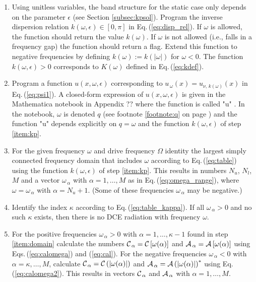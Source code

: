 \begin{enumerate}

\item \label{item:kp} 
Using unitless variables,
the band structure for the static case only depends on the parameter $\epsilon$
(see Section \ref{subsec:kpsol}).
Program the inverse dispersion relation $k(\omega, \epsilon) \in [0, \pi]$ 
in Eq.\,(\ref{eq:disp_rel}). 
If $\omega$ is allowed, the function should return the value $k(\omega)$. If $\omega$ is not allowed 
(i.e., falls in a frequency gap) the function should return a flag.
Extend this function to negative frequencies by defining $k(\omega) := k(|\omega|)$ for $\omega < 0$.
The function $k(\omega, \epsilon) > 0$ corresponds to $K(\omega)$ defined in Eq.\,(\ref{eq:kdef}).

\item \label{item:u}
Program a function $u(x, \omega, \epsilon)$ corresponding to 
$u_{\,\omega}(x) = u_{\nu, \, k(\omega)}(x)$ in Eq.\,(\ref{eq:psi1}).
A closed-form expression of $u(x, \omega, \epsilon)$ is given in the 
\color{red} Mathematica notebook in Appendix ??
\color{blue}
where the function is called 
\color{red} "u" \color{blue}. In the notebook, $\omega$ is denoted $q$
(see footnote \ref{footnote:q} on page \pageref{footnote:q}) and the function \color{red} "u" \color{blue} 
depends explicitly on $q = \omega$ and the function 
$k(\omega,\epsilon)$ of step \ref{item:kp}.
        
\item  \label{item:domain}
For the given frequency $\omega$ and drive frequency $\Omega$ identity the largest simply connected 
frequency domain that includes $\omega$ according to Eq.\,(\ref{eq:table}) using the function $k(\omega,\epsilon)$
of step \ref{item:kp}. This results in numbers
$N_u$, $N_l$, $M$ and a vector $\omega_{\,\alpha}$ with $\alpha = 1, \ldots, M$ as in 
Eq.\,(\ref{eq:omega_range}), where $\omega = \omega_{\,\alpha}$ with $\alpha = N_u + 1$.
(Some of these frequencies $\omega_{\,\alpha}$ may be negative.)

\item \label{item:kappa} 
Identify the index $\kappa$ according to Eq.\,(\ref{eq:table_kappa}). 
If all $\omega_{\,\alpha} > 0$ and no such $\kappa$ exists, then there is no DCE radiation with frequency $\omega$.

\item For the positive frequencies $\omega_{\,\alpha}>0$ with $\alpha = 1, \ldots, \kappa-1$
found in step \ref{item:domain} 
calculate the numbers ${\cal C}_{\,\alpha} = {\cal C}\left[\omega(\alpha)\right]$ and 
${\cal A}_{\,\alpha} = {\cal A}\left[\omega(\alpha)\right]$ using Eqs.\,(\ref{eq:calomega}) and (\ref{eq:cal}).
For the negative frequencies $\omega_{\,\alpha}<0$ with $\alpha = \kappa, \ldots, M$, 
calculate ${\cal C}_{\,\alpha} = {\cal C}\left(|\omega(\alpha)|\right)$ and
${\cal A}_{\,\alpha} = {\cal A}\left(|\omega(\alpha)|\right)^*$
using Eq.\,(\ref{eq:calomega2}).
This results in vectors ${\cal C}_{\,\alpha}$ and ${\cal A}_{\,\alpha}$ 
with $\alpha = 1, \ldots, M$.


\end{enumerate}
